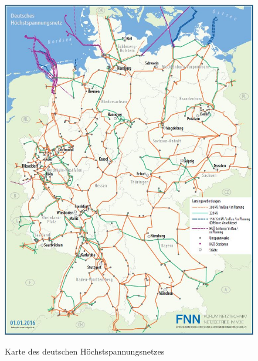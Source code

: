 \begin{figure}[t]
	\centering
	{\includegraphics[scale=0.5]{bilder/hochstspannungsnetz}\label{fig_hochstspannungsnetz}
	}\\
	\caption[Karte des deutschen Höchstspannungsnetzes]{Karte des deutschen Höchstspannungsnetzes}
	\label{fig_hochstspannungsnetz2}
\end{figure}
